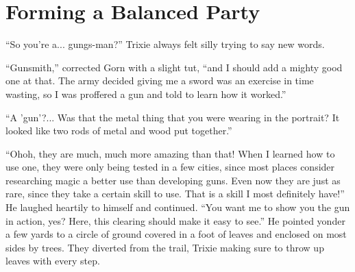 \scenesep

\section{Forming a Balanced Party}

``So you're a... gungs-man?'' Trixie always felt silly trying to say new words.

``Gunsmith,'' corrected Gorn with a slight tut, ``and I should add a mighty good
one at that. The army decided giving me a sword was an exercise in time wasting,
so I was proffered a gun and told to learn how it worked.''

``A 'gun'?... Was that the metal thing that you were wearing in the portrait? It
looked like two rods of metal and wood put together.''

``Ohoh, they are much, much more amazing than that! When I learned how to use
one, they were only being tested in a few cities, since most places consider
researching magic a better use than developing guns. Even now they are just as
rare, since they take a certain skill to use. That is a skill I most definitely
have!'' He laughed heartily to himself and continued. ``You want me to show you
the gun in action, yes? Here, this clearing should make it easy to see.'' He
pointed yonder a few yards to a circle of ground covered in a foot of leaves and
enclosed on most sides by trees. They diverted from the trail, Trixie making
sure to throw up leaves with every step.
